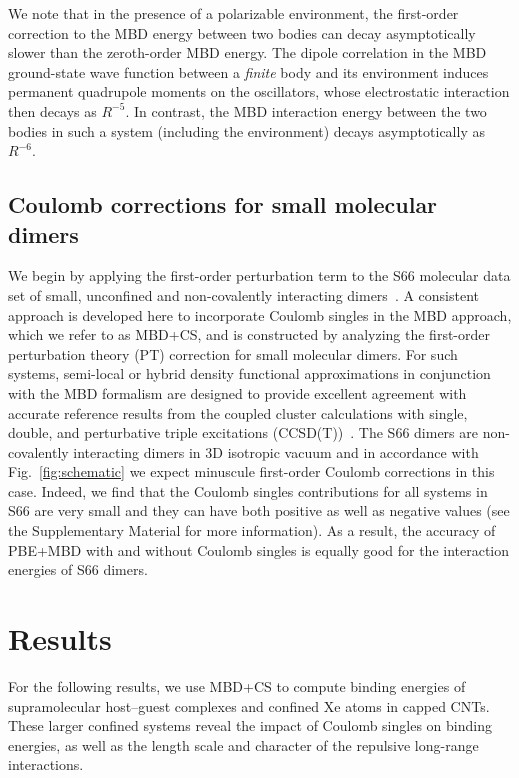 \documentclass[aps,prl,groupaddress, twocolumn]{revtex4-1}  %
\begin{document}
We note that in the presence of a polarizable environment, the first-order correction to the MBD energy between two bodies can decay asymptotically slower than the zeroth-order MBD energy. The dipole correlation in the MBD ground-state wave function between a \emph{finite} body and its environment induces permanent quadrupole moments on the oscillators, whose electrostatic interaction then decays as $R^{-5}$.
In contrast, the MBD interaction energy between the two bodies in such a system (including the environment) decays asymptotically as $R^{-6}$.

\subsection*{Coulomb corrections for small molecular dimers}
We begin by applying the first-order perturbation term to the S66 molecular data set of small, unconfined and non-covalently interacting dimers~\cite{s66X8_database}. A consistent approach is developed here to incorporate Coulomb singles in the MBD approach, which we refer to as MBD+CS, and is constructed by analyzing the first-order perturbation theory (PT) correction for small molecular dimers.
For such systems, semi-local or hybrid density functional approximations in conjunction with the MBD formalism are designed to provide excellent agreement with accurate reference results from the coupled cluster calculations with single, double, and perturbative triple excitations (CCSD(T))~\cite{Tkatchenko2012}.  %
The S66 dimers are
non-covalently interacting dimers in 3D isotropic vacuum and in accordance with Fig.~\ref{fig:schematic} we expect minuscule first-order Coulomb corrections in this case.
Indeed, we find that the Coulomb singles contributions for all systems in S66 are very small and they can have both positive as well as negative values (see the Supplementary Material for more information). As a result, the accuracy of PBE+MBD with and without Coulomb singles is equally good for the interaction energies of S66 dimers. %

\section*{Results}
For the following results, we use MBD+CS to compute binding energies of supramolecular host--guest complexes and confined Xe atoms in capped CNTs. These larger confined systems reveal the impact of Coulomb singles on binding energies, as well as the length scale and character of the repulsive long-range interactions.
\end{document}
